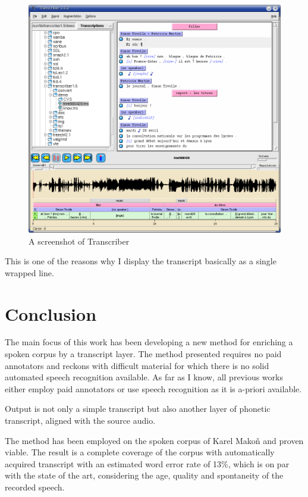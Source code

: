 \documentclass[12pt,a4paper]{report}
\begin{document}
\begin{figure}[htpb]
\includegraphics[scale=0.4]{rc/transcriber1.png}
\caption{A screenshot of Transcriber}
\label{fig:transcriber1}
\end{figure}

This is one of the reasons why I display the transcript basically as a
single wrapped line.

\chapter{Conclusion}

The main focus of this work has been developing a new method for enriching a
spoken corpus by a transcript layer. The method presented requires no paid
annotators and reckons with difficult material for which there is no solid
automated speech recognition available. As far as I know, all previous works
either employ paid annotators or use speech recognition as it is a-priori
available.

Output is not only a simple transcript but also another layer of phonetic
transcript, aligned with the source audio.

The method has been employed on the spoken corpus of Karel Makoň and proven
viable. The result is a complete coverage of the corpus with automatically
acquired transcript with an estimated word error rate of 13\%, which is on par
with the state of the art, considering the age, quality and spontaneity of the
recorded speech.
\end{document}
